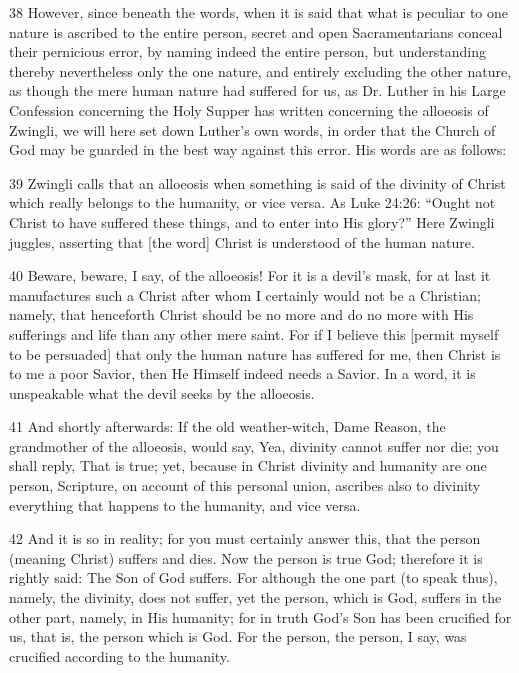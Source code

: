 {38 However, since beneath the words, when it is said that what is peculiar to one nature is ascribed to the entire person, secret and open Sacramentarians conceal their pernicious error, by naming indeed the entire person, but understanding thereby nevertheless only the one nature, and entirely excluding the other nature, as though the mere human nature had suffered for us, as Dr. Luther in his Large Confession concerning the Holy Supper has written concerning the alloeosis of Zwingli, we will here set down Luther’s own words, in order that the Church of God may be guarded in the best way against this error. His words are as follows:

39 Zwingli calls that an alloeosis when something is said of the divinity of Christ which really belongs to the humanity, or vice versa. As Luke 24:26: “Ought not Christ to have suffered these things, and to enter into His glory?” Here Zwingli juggles, asserting that [the word] Christ is understood of the human nature.

40 Beware, beware, I say, of the alloeosis! For it is a devil’s mask, for at last it manufactures such a Christ after whom I certainly would not be a Christian; namely, that henceforth Christ should be no more and do no more with His sufferings and life than any other mere saint. For if I believe this [permit myself to be persuaded] that only the human nature has suffered for me, then Christ is to me a poor Savior, then He Himself indeed needs a Savior. In a word, it is unspeakable what the devil seeks by the alloeosis.

41 And shortly afterwards: If the old weather-witch, Dame Reason, the grandmother of the alloeosis, would say, Yea, divinity cannot suffer nor die; you shall reply, That is true; yet, because in Christ divinity and humanity are one person, Scripture, on account of this personal union, ascribes also to divinity everything that happens to the humanity, and vice versa.

42 And it is so in reality; for you must certainly answer this, that the person (meaning Christ) suffers and dies. Now the person is true God; therefore it is rightly said: The Son of God suffers. For although the one part (to speak thus), namely, the divinity, does not suffer, yet the person, which is God, suffers in the other part, namely, in His humanity; for in truth God’s Son has been crucified for us, that is, the person which is God. For the person, the person, I say, was crucified according to the humanity.

}
